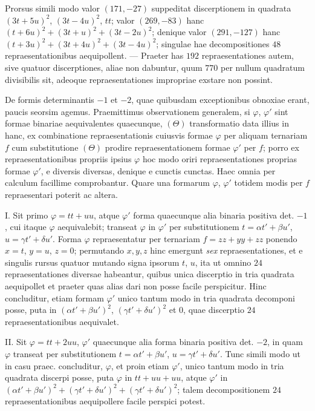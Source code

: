 Prorsus simili modo valor $(171,-27)$ suppeditat discerptionem in quadrata $(3t+5u)^2$, $(3t-4u)^2$, $tt$; valor $(269,-83)$ hanc $(t+6u)^2+(3t+u)^2+(3t-2u)^2$; denique valor $(291,-127)$ hanc $(t+3u)^2+(3t+4u)^2+(3t-4u)^2$; singulae hae decompositiones $48$ repraesentationibus aequipollent. --- Praeter has $192$ repraesentationes autem, sive quatuor discerptiones, aliae non dabuntur, quum $770$ per nullum quadratum divisibilis sit, adeoque repraesentationes impropriae exstare non possint.

De formis determinantis $-1$ et $-2$, quae quibusdam exceptionibus obnoxiae erant, paucis seorsim agemus. Praemittimus observationem generalem, si $\varphi$, $\varphi'$ sint formae binariae aequivalentes quaecunque, $(\Theta)$ transformatio data illius in hanc, ex combinatione repraesentationis cuiusvis formae $\varphi$ per aliquam ternariam $f$ cum substitutione $(\Theta)$ prodire repraesentationem formae $\varphi'$ per $f$; porro ex repraesentationibus propriis ipsius $\varphi$ hoc modo oriri repraesentationes proprias formae $\varphi'$, e diversis diversas, denique e cunctis cunctas. Haec omnia per calculum facillime comprobantur. Quare una formarum $\varphi$, $\varphi'$ totidem modis per $f$ repraesentari poterit ac altera.

I. Sit primo $\varphi=tt+uu$, atque $\varphi'$ forma quaecunque alia binaria positiva det. $-1$, cui itaque $\varphi$ aequivalebit; transeat $\varphi$ in $\varphi'$ per substitutionem $t=\alpha t'+\beta u'$, $u=\gamma t'+\delta u'$. Forma $\varphi$ repraesentatur per ternariam $f=zz+yy+zz$ ponendo $x=t$, $y=u$, $z=0$; permutando $x,y,z$ hinc emergunt \textit{sex} repraesentationes, et e singulis rursus quatuor mutando signa ipsorum $t$, $u$, ita ut omnino $24$ repraesentationes diversae habeantur, quibus unica discerptio in tria quadrata aequipollet et praeter quas alias dari non posse facile perspicitur. Hinc concluditur, etiam formam $\varphi'$ unico tantum modo in tria quadrata decomponi posse, puta in $(\alpha t'+\beta u')^2$, $(\gamma t'+\delta u')^2$ et $0$, quae discerptio $24$ repraesentationibus aequivalet.

II. Sit $\varphi=tt+2uu$, $\varphi'$ quaecunque alia forma binaria positiva det. $-2$, in quam $\varphi$ transeat per substitutionem $t=\alpha t'+\beta u'$, $u=\gamma t'+\delta u'$. Tunc simili modo ut in casu praec. concluditur, $\varphi$, et proin etiam $\varphi'$, unico tantum modo in tria quadrata discerpi posse, puta $\varphi$ in $tt+uu+uu$, atque $\varphi'$ in $(\alpha t'+\beta u')^2+(\gamma t'+\delta u')^2+(\gamma t'+\delta u')^2$; talem decompositionem $24$ repraesentationibus aequipollere facile perspici potest.

